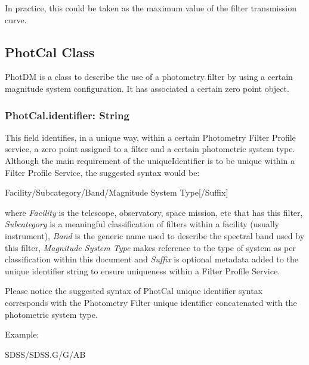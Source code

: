 \documentclass[11pt,a4paper]{ivoa}
\begin{document}
In practice, this could be taken as the maximum value of the filter transmission
curve.\par

\subsection{PhotCal Class}
PhotDM is a class to describe the use of a photometry filter by using a certain magnitude system
configuration. It has associated a certain zero point object.
\par

\subsubsection{PhotCal.identifier: String}
This field identifies, in a unique way, within a certain Photometry Filter Profile
service, a zero point assigned to a filter and a certain photometric system type.
Although the main requirement of the uniqueIdentifier is to be unique within a Filter
Profile Service, the suggested syntax would be:
\par

Facility/Subcategory/Band/Magnitude System Type[/Suffix]
\bigskip


where \textit{Facility} is the telescope, observatory, space mission, etc that
has this filter, \textit{Subcategory} is a meaningful classification of filters
within a facility (usually instrument), \textit{Band} is the generic name used to
describe the spectral band used by this filter, \textit{Magnitude System Type}
makes reference to the type of system as per classification within this document
and \textit{Suffix} is optional metadata added to the unique identifier string to
ensure uniqueness within a Filter Profile Service.
\par

Please notice the suggested syntax of PhotCal unique identifier syntax corresponds
with the Photometry Filter unique identifier concatenated with the photometric
system type.
\par

Example:
\par



SDSS/SDSS.G/G/AB
\bigskip


\end{document}
